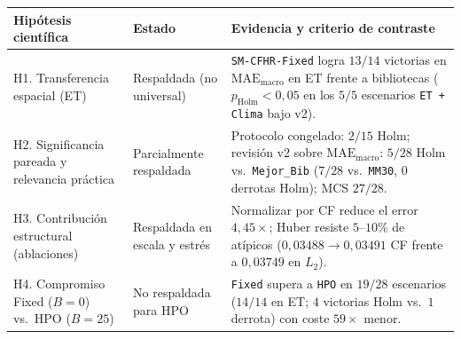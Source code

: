 \begin{tabular}{@{}p{3.8cm}p{2.6cm}p{5.5cm}@{}}
\toprule
Hipótesis científica & Estado & Evidencia y criterio de contraste \\
\midrule
H1. Transferencia espacial (ET) & Respaldada (no universal) & \texttt{SM-CFHR-Fixed} logra $13/14$ victorias en $\mathrm{MAE}_{\mathrm{macro}}$ en ET frente a bibliotecas ($p_{\mathrm{Holm}}<0{,}05$ en los $5/5$ escenarios \texttt{ET + Clima} bajo v2). \\
H2. Significancia pareada y relevancia práctica & Parcialmente respaldada & Protocolo congelado: $2/15$ Holm; revisión v2 sobre $\mathrm{MAE}_{\mathrm{macro}}$: $5/28$ Holm vs.\ \texttt{Mejor\_Bib} ($7/28$ vs.\ \texttt{MM30}, $0$ derrotas Holm); MCS $27/28$. \\
H3. Contribución estructural (ablaciones) & Respaldada en escala y estrés & Normalizar por CF reduce el error $4{,}45\times$; Huber resiste $5$--$10\%$ de atípicos ($0{,}03488 \to 0{,}03491$ CF frente a $0{,}03749$ en $L_2$). \\
H4. Compromiso Fixed ($B=0$) vs.\ HPO ($B=25$) & No respaldada para HPO & \texttt{Fixed} supera a \texttt{HPO} en $19/28$ escenarios ($14/14$ en ET; $4$ victorias Holm vs.\ $1$ derrota) con coste $59\times$ menor. \\
\bottomrule
\end{tabular}
